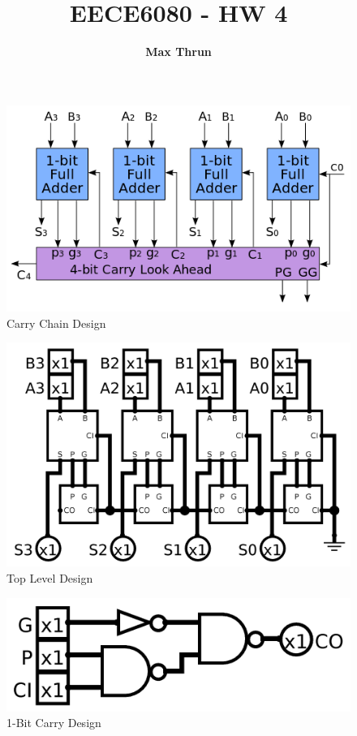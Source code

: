 \documentclass{article}
\title{
    \vspace{2in}
    \textmd{\textbf{EECE6080 - HW 4}}\\
    \vspace{4in}
}
\author{\textbf{Max Thrun}}
\begin{document}
\maketitle

\begin{figure}[H]
    \centering
    \includegraphics[width=\linewidth]{../4-bit_carry_lookahead_adder.png}
    \caption{Carry Chain Design}
\end{figure}

\begin{figure}[H]
    \centering
    \includegraphics[width=\linewidth]{../logisim_top.png}
    \caption{Top Level Design}
\end{figure}

\begin{figure}[H]
    \centering
    \includegraphics[width=\linewidth]{../logisim_carry_slice.png}
    \caption{1-Bit Carry Design}
\end{figure}
\end{document}
